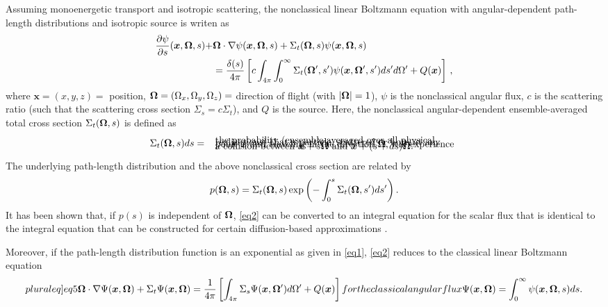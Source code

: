 \documentclass[12pt]{article}
\newcommand{\ux}{{\bm x}}
\newcommand{\uomega}{{\bf \Omega}}
\newcommand{\unabla}{{\bf \nabla}}
\begin{document}
Assuming monoenergetic transport and isotropic scattering, the nonclassical linear Boltzmann equation with angular-dependent path-length distributions and isotropic source is writen as
\begin{align}\label{eq2}
\frac{\partial\psi}{\partial s}(\ux,\uomega,s) + &\uomega\cdot\unabla \psi(\ux,\uomega,s) + \Sigma_t(\uomega,s)\psi(\ux,\uomega,s) 
\\&= \frac{\delta(s)}{4\pi}\left[ c\int_{4\pi}\int_0^\infty \Sigma_t(\uomega',s')\psi(\ux,\uomega',s')ds' d\Omega' + Q(\ux) \right]\,, \nonumber
\end{align}
where $\ux = (x,y,z)=$ position, $\uomega = (\Omega_x,\Omega_y,\Omega_z)=$ direction of flight (with $|\uomega|=1$), $\psi$ is the nonclassical angular flux, $c$ is the scattering ratio (such that the scattering cross section $\Sigma_s= c\Sigma_t$), and $Q$ is the source.
Here, the nonclassical angular-dependent ensemble-averaged total cross section $\Sigma_t(\uomega,s)$
is defined as
\begin{align}\label{eq3}
\Sigma_t(\uomega,s)ds =  \begin{array}{l}
\text{ the probability (ensemble-averaged over all physical}\vspace{-10pt}\\
\text{ realizations) that a particle, scattered or born at any}\vspace{-10pt}\\
\text{ point $\ux$ and traveling in the direction $\uomega$, will experience}\vspace{-10pt}\\
\text{ a collision between $\ux + s\uomega$ and $\ux + (s+ds)\uomega$.}
\end{array}
 \end{align}
The underlying path-length distribution and the above nonclassical cross section are related \cite{vaslar14a} by
\begin{align}\label{eq4}
	p(\uomega,s) = \Sigma_t(\uomega,s)\exp\left( -\int_0^s\Sigma_t(\uomega,s')ds'\right).
\end{align}
It has been shown that, if $p(s)$ is independent of $\uomega$, \cref{eq2} can be converted to an integral equation for the scalar flux that is identical to the integral equation that can be constructed for certain diffusion-based approximations \cite{siap15,vas16}.

Moreover, if the path-length distribution function is an exponential as given in \cref{eq1}, \cref{eq2} reduces to the classical linear Boltzmann equation
\begin{subequations}\label[pluraleq]{eq5}
\begin{align}\label{eq5a}
\uomega\cdot{\unabla} \Psi(\ux,\uomega) + \Sigma_t\Psi(\ux,\uomega) = \frac{1}{4\pi}\left[\int_{4\pi}\Sigma_s\Psi(\ux,\uomega')d\Omega' + Q(\ux) \right]\,
\end{align}
for the classical angular flux 
\begin{align}
\Psi(\ux,\uomega) = \int_0^\infty \psi(\ux,\uomega,s)ds.
\end{align} 
\end{subequations}
\end{document}
